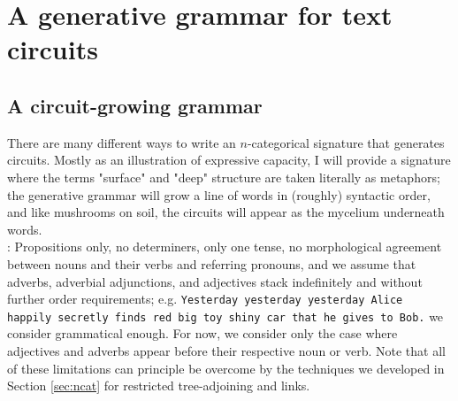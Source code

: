 \newpage

\section{A generative grammar for text circuits}

\subsection{A circuit-growing grammar}

There are many different ways to write an $n$-categorical signature that generates circuits. Mostly as an illustration of expressive capacity, I will provide a signature where the terms "surface" and "deep" structure are taken literally as metaphors; the generative grammar will grow a line of words in (roughly) syntactic order, and like mushrooms on soil, the circuits will appear as the mycelium underneath words.\\

: Propositions only, no determiners, only one tense, no morphological agreement between nouns and their verbs and referring pronouns, and we assume that adverbs, adverbial adjunctions, and adjectives stack indefinitely and without further order requirements; e.g. \texttt{Yesterday yesterday yesterday Alice happily secretly finds red big toy shiny car that he gives to Bob.} we consider grammatical enough. For now, we consider only the case where adjectives and adverbs appear before their respective noun or verb. Note that all of these limitations can principle be overcome by the techniques we developed in Section \ref{sec:ncat} for restricted tree-adjoining and links.



